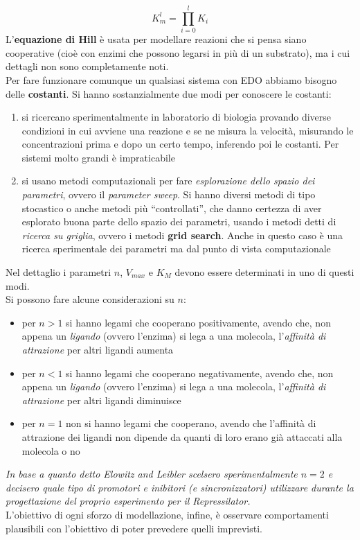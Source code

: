 \documentclass[a4paper,12pt, oneside]{book}
\begin{document}
\[K_m^l=\prod_{i=0}^lK_i\]
L'\textbf{equazione di Hill} è usata per modellare reazioni che si pensa
siano cooperative (cioè con enzimi che possono legarsi in più di un substrato),
ma i cui dettagli non sono completamente noti.\\
Per fare funzionare comunque un qualsiasi sistema con EDO abbiamo bisogno delle
\textbf{costanti}. Si hanno sostanzialmente due modi per conoscere le costanti:
\begin{enumerate}
  \item si ricercano sperimentalmente in laboratorio di biologia provando
  diverse condizioni in cui avviene una reazione e se ne misura la velocità,
  misurando le concentrazioni prima e dopo un certo tempo, inferendo poi le
  costanti. Per sistemi molto grandi è impraticabile
  \item si usano metodi computazionali per fare \textit{esplorazione dello
    spazio dei parametri}, ovvero il \textit{parameter sweep}. Si hanno diversi
  metodi di tipo stocastico o anche metodi più ``controllati'', che danno
  certezza di aver esplorato buona parte dello spazio dei parametri, usando i
  metodi detti di \textit{ricerca su griglia}, ovvero i metodi \textbf{grid
    search}. Anche in questo caso è una ricerca sperimentale dei parametri ma
  dal punto di vista computazionale
\end{enumerate}
Nel dettaglio i parametri $n$, $V_{max}$ e $K_M$ devono essere determinati in
uno di questi modi.\\
Si possono fare alcune considerazioni su $n$:
\begin{itemize}
  \item per $n>1$ si hanno legami che cooperano positivamente, avendo che, non
  appena un \textit{ligando} (ovvero l'enzima) si lega a una molecola,
  l'\textit{affinità di attrazione} per altri ligandi aumenta 
  \item per $n<1$ si hanno legami che cooperano negativamente, avendo che, non
  appena un \textit{ligando} (ovvero l'enzima) si lega a una molecola,
  l'\textit{affinità di attrazione} per altri ligandi diminuisce
  \item per $n=1$ non si hanno legami che cooperano, avendo che l'affinità di
  attrazione dei ligandi non dipende da quanti di loro erano già attaccati alla
  molecola o no  
\end{itemize}
\textit{In base a quanto detto Elowitz and Leibler scelsero sperimentalmente
  $n=2$ e decisero quale tipo di promotori e inibitori (e sincronizzatori)
  utilizzare durante la progettazione del proprio esperimento per
  il Repressilator.}  \\
L'obiettivo di ogni sforzo di modellazione, infine, è osservare comportamenti
plausibili con l'obiettivo di poter prevedere quelli imprevisti.
\end{document}
